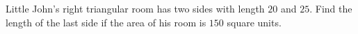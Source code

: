 Little John's right triangular room has two sides with length $20$ and $25$. Find the length of the last side if the area of his room is $150$ square units.
